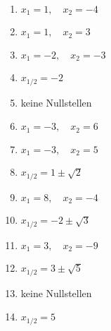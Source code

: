 \newpage
\begin{Answer}[ref=normalformNullstellenA1]
	
	\begin{minipage}{\textwidth}
		\begin{minipage}{0.49\textwidth}
			\begin{enumerate}[label=\alph*)]
				\item \(x_1=1,\quad x_2=-4\)
				\item \(x_1=1,\quad x_2=3\)
				\item \(x_1=-2,\quad x_2=-3\)
				\item \(x_{1/2}=-2\)
				\item keine Nullstellen
				\item \(x_1=-3,\quad x_2=6\)
				\item \(x_1=-3,\quad x_2=5\)
			\end{enumerate}
		\end{minipage}
		\begin{minipage}{0.49\textwidth}
			\begin{enumerate}[label=\alph*)]
				\setcounter{enumi}{7}
				\item \(x_{1/2}=1\pm\sqrt{2}\)
				\item \(x_1=8,\quad x_2=-4\)
				\item \(x_{1/2}=-2\pm\sqrt{3}\)
				\item \(x_1=3,\quad x_2=-9\)
				\item \(x_{1/2}=3\pm\sqrt{5}\)
				\item keine Nullstellen
				\item \(x_{1/2}=5\)
			\end{enumerate}
		\end{minipage}
	\end{minipage}
\end{Answer}